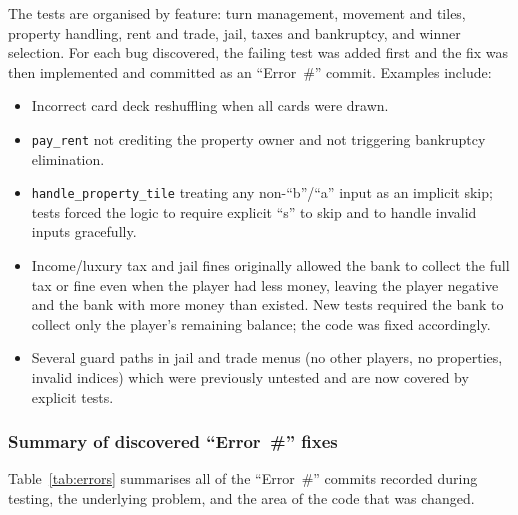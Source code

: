 \documentclass[11pt]{article}
\begin{document}
The tests are organised by feature: turn management, movement and tiles, property handling, rent and trade, jail, taxes and bankruptcy, and winner selection.  For each bug discovered, the failing test was added first and the fix was then implemented and committed as an ``Error~\#'' commit.  Examples include:

\begin{itemize}
  \item Incorrect card deck reshuffling when all cards were drawn.
  \item \texttt{pay\_rent} not crediting the property owner and not triggering bankruptcy elimination.
  \item \texttt{handle\_property\_tile} treating any non-``b''/``a'' input as an implicit skip; tests forced the logic to require explicit ``s'' to skip and to handle invalid inputs gracefully.
  \item Income/luxury tax and jail fines originally allowed the bank to collect the full tax or fine even when the player had less money, leaving the player negative and the bank with more money than existed.  New tests required the bank to collect only the player's remaining balance; the code was fixed accordingly.
  \item Several guard paths in jail and trade menus (no other players, no properties, invalid indices) which were previously untested and are now covered by explicit tests.

\end{itemize}

\subsubsection*{Summary of discovered ``Error~\#'' fixes}

Table~\ref{tab:errors} summarises all of the ``Error~\#'' commits recorded during testing, the underlying problem, and the area of the code that was changed.
\end{document}
